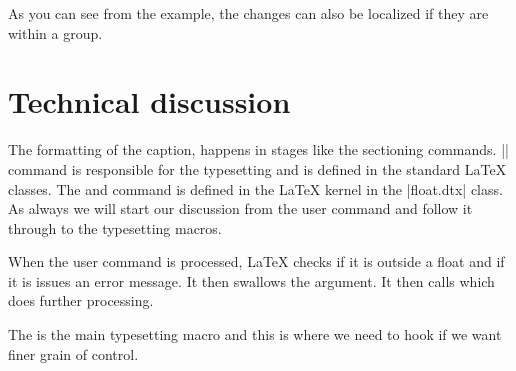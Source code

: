 As you can see from the example, the changes can also be localized if
they are within a group.



\makeatletter
\def\captionlabelfont@cx{bf}
\makeatother



\begin{texexample}{}{}
\end{texexample}



\section{Technical discussion}

The formatting of the caption, happens in stages like the sectioning commands.  |\@makecaption|  command is responsible for the typesetting and is defined in the standard LaTeX classes. The  and command is defined in the LaTeX kernel in the 
|float.dtx| class. As always we will start our discussion from the user command and follow it through to the typesetting macros.

When the user command  is processed, LaTeX checks if it is outside a float and if it is issues an error message. It then swallows the argument. It then calls  which does further processing.

\begin{teXXX}
\def\caption{%
  \ifx\@captype\@undefined
   \@latex@error{\noexpand\caption outside float}\@ehd
   \expandafter\@gobble
 \else
   \refstepcounter\@captype
  \expandafter\@firstofone
 \fi
 {\@dblarg{\@caption\@captype}}%
}

\long{}
\end{teXXX}


The  is the main typesetting macro and this is
where we need to hook if we want finer grain of control.

